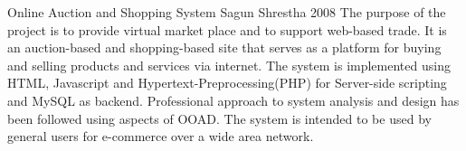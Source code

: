  \begin{conf-abstract}[]
{Online Auction and Shopping System}
{
Sagun Shrestha
}
{2008}
The purpose of the project is to provide virtual market place and to support web-based trade. It is an auction-based and shopping-based site that serves as a platform for buying and selling products and services via internet. The system is implemented using HTML, Javascript and Hypertext-Preprocessing(PHP) for Server-side scripting and MySQL as backend. Professional approach to system analysis and design has been followed using aspects of OOAD. The system is intended to be used by general users for e-commerce over a wide area network.
  \end{conf-abstract}